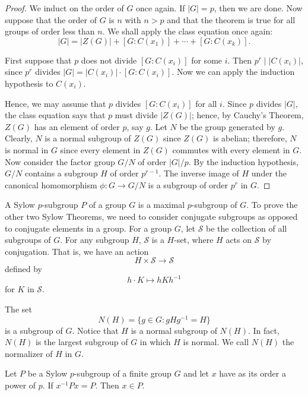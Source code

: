  
\begin{proof}
We induct on the order of $G$ once again.  If $|G|=p$, then we are
done. Now suppose that the order of $G$ is $n$ with $n>p$ and that the
theorem is true for all groups of order less than $n$. We shall apply
the class equation once again: 
\[
|G| = |Z(G)| + [G: C(x_1) ] + \cdots + [ G: C(x_k)].
\]
 
 
First suppose that $p$ does not divide $[G:C(x_i)]$ for some $i$. Then
\mbox{$p^r \mid |C(x_i)|$}, since $p^r$ divides $|G| = |C(x_i)| \cdot
[G:C(x_i)]$. Now we can apply the induction hypothesis to $C(x_i)$.  
 
 
Hence, we may assume that $p$ divides $[G:C(x_i)]$ for all $i$.
Since $p$ divides $|G|$, the class equation says that $p$ must
divide $|Z(G)|$; hence, by Cauchy's Theorem, $Z(G)$ has an element of
order $p$, say $g$. Let $N$ be the group generated by $g$. Clearly,
$N$ is a normal subgroup of $Z(G)$ since $Z(G)$ is abelian; therefore,
$N$ is normal in $G$ since every element in $Z(G)$ commutes with every
element in $G$. Now consider the factor group $G/N$ of order $|G|/p$.
By the induction hypothesis, $G/N$ contains a subgroup $H$ of order
$p^{r- 1}$. The inverse image of $H$ under the canonical homomorphism
$\phi : G \rightarrow G/N$ is a subgroup of order $p^r$ in $G$. 
\end{proof}
 
 
\medskip
 
 
A {\bfi Sylow $p$-subgroup}  $P$ of a group $G$ is a
maximal $p$-subgroup of $G$. To prove the other two Sylow Theorems, we
need to consider conjugate subgroups as opposed to conjugate elements
in a group. For a group $G$, let ${\mathcal S}$ be the collection of all
subgroups of $G$. For any subgroup $H$, ${\mathcal S}$ is a $H$-set, where 
$H$ acts on ${\mathcal S}$ by conjugation. That is, we have an action 
\[
H \times  {\mathcal S}  \rightarrow  {\mathcal S}
\]
defined by
\[
h \cdot K \mapsto hKh^{-1}
\]
for $K$ in ${\mathcal S}$.
 
 
The set
\[
N(H) = \{  g \in G : g H g^{-1} = H\}\label{notenormalizer}
\]
is a subgroup of $G$. Notice that $H$ is a normal subgroup of $N(H)$.
In fact, $N(H)$ is the largest subgroup of $G$ in which $H$ is normal.
We call $N(H)$ the {\bfi normalizer\/} of $H$ in $G$.
 
 
\begin{lemma}\label{p_order_lemma}
Let $P$ be a Sylow $p$-subgroup of a finite group $G$ and let $x$ have
as its order a power of $p$. If $x^{-1} P x = P$. Then $x \in P$.
\end{lemma}
 
